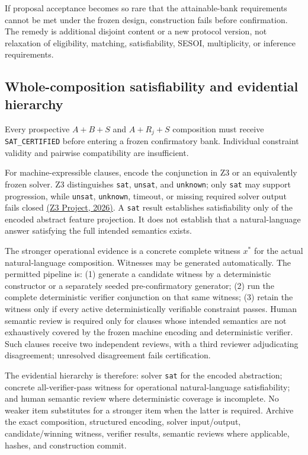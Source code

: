 \documentclass[11pt,a4paper]{article}
\newcommand{\SATCERT}{\texttt{SAT\_CERTIFIED}}
\begin{document}
If proposal acceptance becomes so rare that the attainable-bank requirements cannot be met under the frozen design, construction fails before confirmation. The remedy is additional disjoint content or a new protocol version, not relaxation of eligibility, matching, satisfiability, SESOI, multiplicity, or inference requirements.

\subsection{Whole-composition satisfiability and evidential hierarchy}
Every prospective $A+B+S$ and $A+R_j+S$ composition must receive \SATCERT{} before entering a frozen confirmatory bank. Individual constraint validity and pairwise compatibility are insufficient.

For machine-expressible clauses, encode the conjunction in Z3 or an equivalently frozen solver. Z3 distinguishes \texttt{sat}, \texttt{unsat}, and \texttt{unknown}; only \texttt{sat} may support progression, while \texttt{unsat}, \texttt{unknown}, timeout, or missing required solver output fails closed \href{https://z3prover.github.io/api/html/js/interfaces/Solver.html}{(Z3 Project, 2026)}. A \texttt{sat} result establishes satisfiability only of the encoded abstract feature projection. It does not establish that a natural-language answer satisfying the full intended semantics exists.

The stronger operational evidence is a concrete complete witness $x^\ast$ for the actual natural-language composition. Witnesses may be generated automatically. The permitted pipeline is: (1) generate a candidate witness by a deterministic constructor or a separately seeded pre-confirmatory generator; (2) run the complete deterministic verifier conjunction on that same witness; (3) retain the witness only if every active deterministically verifiable constraint passes. Human semantic review is required only for clauses whose intended semantics are not exhaustively covered by the frozen machine encoding and deterministic verifier. Such clauses receive two independent reviews, with a third reviewer adjudicating disagreement; unresolved disagreement fails certification.

The evidential hierarchy is therefore: solver \texttt{sat} for the encoded abstraction; concrete all-verifier-pass witness for operational natural-language satisfiability; and human semantic review where deterministic coverage is incomplete. No weaker item substitutes for a stronger item when the latter is required. Archive the exact composition, structured encoding, solver input/output, candidate/winning witness, verifier results, semantic reviews where applicable, hashes, and construction commit.
\end{document}
